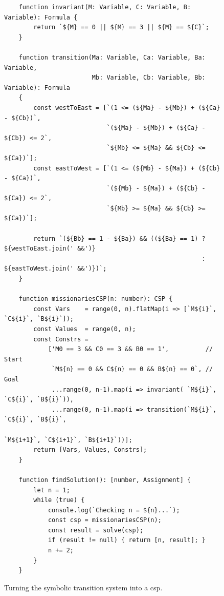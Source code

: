 \begin{figure}[!ht]
\centering
\begin{verbatim}
    function invariant(M: Variable, C: Variable, B: Variable): Formula {
        return `${M} == 0 || ${M} == 3 || ${M} == ${C}`;
    }
      
    function transition(Ma: Variable, Ca: Variable, Ba: Variable, 
                        Mb: Variable, Cb: Variable, Bb: Variable): Formula 
    {
        const westToEast = [`(1 <= (${Ma} - ${Mb}) + (${Ca} - ${Cb})`,
                            `(${Ma} - ${Mb}) + (${Ca} - ${Cb}) <= 2`,
                            `${Mb} <= ${Ma} && ${Cb} <= ${Ca})`];
        const eastToWest = [`(1 <= (${Mb} - ${Ma}) + (${Cb} - ${Ca})`, 
                            `(${Mb} - ${Ma}) + (${Cb} - ${Ca}) <= 2`, 
                            `${Mb} >= ${Ma} && ${Cb} >= ${Ca})`];
        
        return `(${Bb} == 1 - ${Ba}) && ((${Ba} == 1) ? ${westToEast.join(' &&')} 
                                                      : ${eastToWest.join(' &&')})`;
    }             

    function missionariesCSP(n: number): CSP {
        const Vars    = range(0, n).flatMap(i => [`M${i}`, `C${i}`, `B${i}`]);
        const Values  = range(0, n);
        const Constrs =
            ['M0 == 3 && C0 == 3 && B0 == 1',          // Start
             `M${n} == 0 && C${n} == 0 && B${n} == 0`, // Goal
             ...range(0, n-1).map(i => invariant( `M${i}`, `C${i}`, `B${i}`)),
             ...range(0, n-1).map(i => transition(`M${i}`, `C${i}`, `B${i}`, 
                                                  `M${i+1}`, `C${i+1}`, `B${i+1}`))];
        return [Vars, Values, Constrs];
    }

    function findSolution(): [number, Assignment] {
        let n = 1;
        while (true) {
            console.log(`Checking n = ${n}...`);
            const csp = missionariesCSP(n);
            const result = solve(csp);
            if (result != null) { return [n, result]; }
            n += 2;
        }
    }        
\end{verbatim}
\vspace*{-0.3cm}
\caption{Turning the symbolic transition system into a \Gls{csp}.}
\label{fig:Missionaries-STS.ipynb}
\end{figure} %

